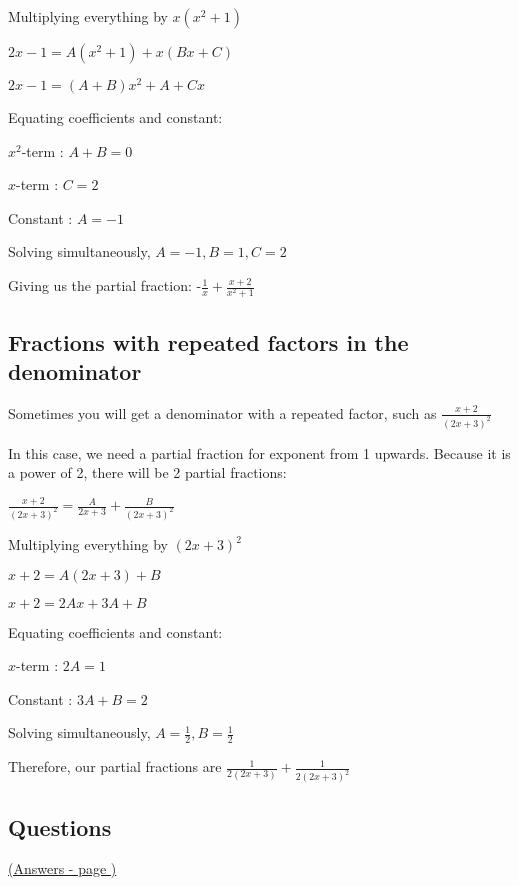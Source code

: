 \documentclass[../main.tex]{subfiles}
\begin{document}
Multiplying everything by $x(x^2+1)$

$2x-1=A(x^2+1)+x(Bx+C)$

$2x-1=(A+B)x^2+A+Cx$

Equating coefficients and constant:

$x^2$-term : $A+B=0$

$x$-term : $C=2$

Constant : $A=-1$

Solving simultaneously, $A=-1, B=1, C=2$

Giving us the partial fraction: -$\frac{1}{x}+\frac{x+2}{x^2+1}$

\subsection*{Fractions with repeated factors in the denominator}
Sometimes you will get a denominator with a repeated factor, such as $\frac{x+2}{(2x+3)^2}$

In this case, we need a partial fraction for exponent from 1 upwards. Because it is a power of 2, there will be 2 partial fractions:

$\frac{x+2}{(2x+3)^2}=\frac{A}{2x+3}+\frac{B}{(2x+3)^2}$

Multiplying everything by $(2x+3)^2$

$x+2=A(2x+3)+B$

$x+2=2Ax+3A+B$

Equating coefficients and constant:

$x$-term : $2A=1$

Constant : $3A+B=2$

Solving simultaneously, $A=\frac{1}{2}, B=\frac{1}{2}$

Therefore, our partial fractions are $\frac{1}{2(2x+3)}+\frac{1}{2(2x+3)^2}$



\pagebreak
\hypertarget{partialfractionsquestions}{\subsection*{Questions}}
\hyperlink{partialfractionsanswers}{(Answers - page \pageref*{Partial fractions answers})}
\label{partial fractions}
\end{document}
